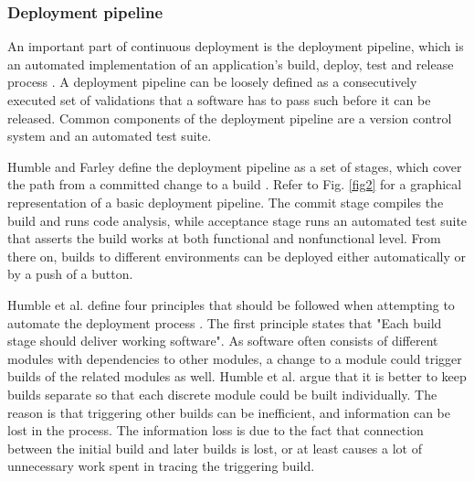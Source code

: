 \documentclass[english]{tktltiki2}
\theoremstyle{definition}
\theoremstyle{remark}
\begin{document}
\subsubsection{Deployment pipeline}
An important part of continuous deployment is the deployment pipeline, which is an automated implementation of an application's build, deploy, test and release process \cite{cdbook}. A deployment pipeline can be loosely defined as a consecutively executed set of validations that a software has to pass such before it can be released. Common components of the deployment pipeline are a version control system and an automated test suite.

Humble and Farley define the deployment pipeline as a set of stages, which cover the path from a committed change to a build \cite{cdbook}. Refer to Fig. \ref{fig2} for a graphical representation of a basic deployment pipeline. The commit stage compiles the build and runs code analysis, while acceptance stage runs an automated test suite that asserts the build works at both functional and nonfunctional level. From there on, builds to different environments can be deployed either automatically or by a push of a button.

Humble et al. define four principles that should be followed when attempting to automate the deployment process \cite{humble2006deployment}. The first principle states that "Each build stage should deliver working software". As software often consists of different modules with dependencies to other modules, a change to a module could trigger builds of the related modules as well. Humble et al. argue that it is better to keep builds separate so that each discrete module could be built individually. The reason is that triggering other builds can be inefficient, and information can be lost in the process. The information loss is due to the fact that connection between the initial build and later builds is lost, or at least causes a lot of unnecessary work spent in tracing the triggering build. 
\end{document}
